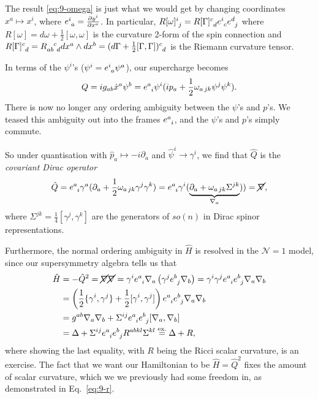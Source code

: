 
The result \eqref{eq:9-omega} is just what we would get by changing coordinates $x^{a} \mapsto x^{i}$, where $e\indices{^{i}_{a}} = \frac{\partial y^{i}}{\partial x^{a}}$. In particular, $R[\omega]\indices{^{i}_{j}} = R[\Gamma]\indices{^{c}_{d}} e\indices{^{i}_{c}} e\indices{^{d}_{j}}$ where $R[\omega] = d \omega + \frac{1}{2} [\omega, \omega]$ is the curvature 2-form of the spin connection and $R[\Gamma]\indices{^{c}_{d}} = R\indices{_{ab}^{c}_{d}} dx^{a} \wedge dx^{b} = (d\Gamma + \frac{1}{2} [\Gamma, \Gamma])\indices{^{c}_{d}}$ is the Riemann curvature tensor.

In terms of the $\psi^{i}$'s ($\psi^{i} = e\indices{^{i}_{a}} \psi^{a}$), our supercharge becomes
\begin{equation}
  Q = i g_{ab} \dot{x}^{a} \psi^{b} = e\indices{^{a}_{i}} \psi^{i} (i p_{a} + \frac{1}{2} \omega_{a\, jk} \psi^{j} \psi^{k}).
\end{equation}
There is now no longer any ordering ambiguity between the $\psi$'s and $p$'s. We teased this ambiguity out into the frames $e\indices{^{a}_{i}}$, and the $\psi$'s and $p$'s simply commute.

So under quantisation with $\hat{p}_a \mapsto -i \partial_a$ and $\hat{\psi}^{i} \to \gamma^{i}$, we find that $\hat{Q}$ is the \emph{covariant Dirac operator}
\begin{equation}
  \hat{Q} = e\indices{^{a}_{i}} \gamma^{a} (\partial_{a} + \frac{1}{2} \omega_{a\, jk} \gamma^{j} \gamma^{k}) = e\indices{^{a}_{i}} \gamma^{i} (\underbrace{\partial_{a} + \omega_{a\, jk} \Sigma^{jk}}_{\nabla_a})) = \cancel{\nabla}, 
\end{equation}
where $\Sigma^{jk} = \frac{1}{4} [\gamma^{j}, \gamma^{k}]$ are the generators of $so(n)$ in Dirac spinor representations.

Furthermore, the normal ordering ambiguity in $\hat{H}$ is resolved in the $\mathcal{N} = 1$ model, since our supersymmetry algebra tells us that 
\begin{align}
\hat{H} &= -\hat{Q}^2 = \cancel{\nabla} \cancel{\nabla} = \gamma^{i} e\indices{^{a}_{i}} \nabla_a \left( \gamma^{j} e\indices{^{b}_{j}} \nabla_b \right)
= \gamma^{i} \gamma^{j} e\indices{^{a}_{i}} e\indices{^{b}_{j}} \nabla_a \nabla_b \\
&= \left( \frac{1}{2} \{\gamma^{i}, \gamma^{j}\} + \frac{1}{2} [\gamma^{i}, \gamma^{j}] \right) e\indices{^{a}_{i}} e\indices{^{b}_{j}} \nabla_a \nabla_b \\
&= g^{ab} \nabla_a \nabla_b + \Sigma^{ij} e\indices{^{a}_{i}} e\indices{^{b}_{j}} [\nabla_a, \nabla_b] \\
&= \Delta + \Sigma^{ij} e\indices{^{a}_{i}} e\indices{^{b}_{j}} R^{abkl} \Sigma^{kl} \stackrel{\text{ex.}}{=} \Delta + R,
\end{align}
where showing the last equality, with $R$ being the Ricci scalar curvature, is an exercise.
The fact that we want our Hamiltonian to be $\hat{H} = \hat{Q}^2$ fixes the amount of scalar curvature, which we we previously had some freedom in, as demonstrated in Eq.~\eqref{eq:9-r}.

